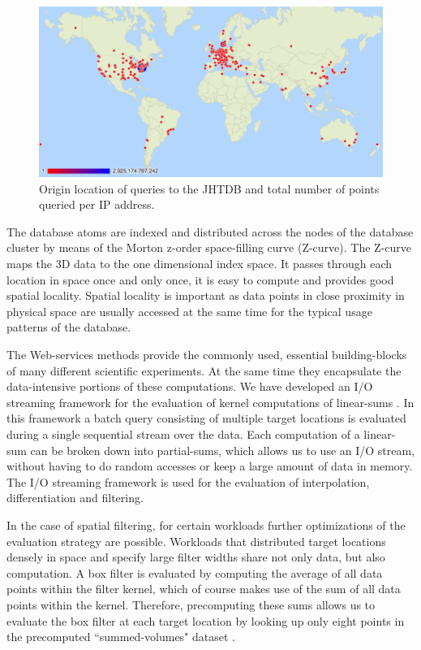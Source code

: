 \documentclass[10pt,twocolumn]{article}
\begin{document}
\begin{figure}
\includegraphics[width=1.0\textwidth]{ip_map.png}
\caption{Origin location of queries to the JHTDB and total number of points queried per IP address.}
\label{fig:ip_map}
\end{figure}

The database atoms are indexed and distributed across the nodes of the database cluster by means of the Morton z-order space-filling curve (Z-curve). The 
Z-curve maps the 3D data to the one dimensional index space. It passes through each location in space once and only once, it is easy to compute and
provides good spatial locality. Spatial locality is important as data points in close proximity in physical space are usually accessed at the same time for the
typical usage patterns of the database.

The Web-services methods provide the commonly used, essential building-blocks of many different scientific experiments. At the same time they
encapsulate the data-intensive portions of these computations. We have developed an I/O streaming framework for the evaluation of kernel computations of
linear-sums \cite{KanovSC11}. In this framework a batch query consisting of multiple target locations is evaluated during a single sequential stream over 
the data. Each computation of a linear-sum can be broken down into partial-sums, which allows us to use an I/O stream, without having to do random 
accesses or keep a large amount of data in memory. The I/O streaming framework is used for the evaluation of interpolation, differentiation and filtering.

In the case of spatial filtering, for certain workloads further optimizations of the evaluation strategy are possible. Workloads that distributed target locations
densely in space and specify large filter widths share not only data, but also computation. A box filter is evaluated by computing the average of all data
points within the filter kernel, which of course makes use of the sum of all data points within the kernel. Therefore, precomputing these sums allows us to
evaluate the box filter at each target location by looking up only eight points in the precomputed ``summed-volumes" dataset \cite{KanovSC12}.
\end{document}
